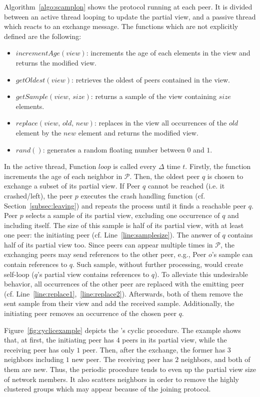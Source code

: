 Algorithm~\ref{algo:scamplon} shows the \SPRAY{} protocol running at each
peer. It is divided between an active thread looping to update the partial
view, and a passive thread which reacts to an exchange message. The functions
which are not explicitly defined are the following:
\begin{itemize}
\item $incrementAge(view)$: increments the age of each elements in the view
  and returns the modified view.
\item $getOldest(view)$: retrieves the oldest of peers contained in the view.
\item $getSample(view, \, size)$: returns a sample of the view containing
  $size$ elements.
\item $replace(view,\,old,\,new)$: replaces in the view all occurrences of
  the $old$ element by the $new$ element and returns the modified view.
\item $rand()$: generates a random floating number between $0$ and $1$.
\end{itemize}
In the active thread, Function $loop$ is called every $\Delta$ time
$t$. Firstly, the function increments the age of each neighbor in
$\mathcal{P}$. Then, the oldest peer $q$ is chosen to exchange a subset of its
partial view. If Peer $q$ cannot be reached (i.e. it crashed/left), the peer
$p$ executes the crash handling function (cf. Section~\ref{subsec:leaving}) and
repeats the process until it finds a reachable peer $q$. Peer $p$ selects a
sample of its partial view, excluding one occurrence of $q$ and including
itself. The size of this sample is half of its partial view, with at least one
peer: the initiating peer (cf. Line~\ref{line:samplesize}). The answer of $q$
contains half of its partial view too. Since peers can appear multiple times in
$\mathcal{P}$, the exchanging peers may send references to the other peer,
e.g., Peer $o$'s sample can contain references to $q$. Such sample, without
further processing, would create self-loop ($q$'s partial view contains
references to $q$). To alleviate this undesirable behavior, all occurrences of
the other peer are replaced with the emitting peer
(cf. Line~\ref{line:replace1},~\ref{line:replace2}).  Afterwards, both of
them remove the sent sample from their view and add the received
sample. Additionally, the initiating peer removes an occurrence of the chosen
peer $q$.



Figure~\ref{fig:cyclicexample} depicts the \SPRAY{}'s cyclic procedure. The
example shows that, at first, the initiating peer has $4$ peers in its partial
view, while the receiving peer has only $1$ peer. Then, after the exchange, the
former has $3$ neighbors including $1$ new peer. The receiving peer has $2$
neighbors, and both of them are new. Thus, the periodic procedure tends to
even up the partial view size of network members. It also scatters neighbors in
order to remove the highly clustered groups which may appear because of the
joining protocol.


